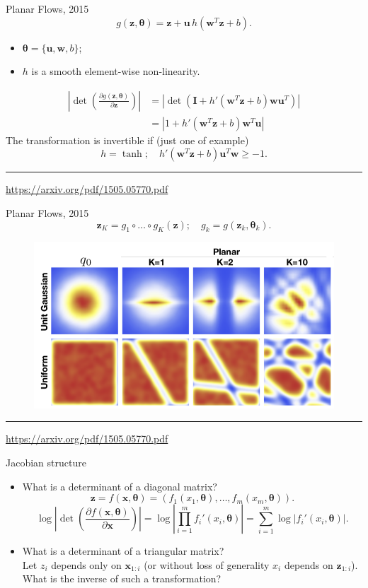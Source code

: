 \documentclass{beamer}
\newcommand{\bu}{\mathbf{u}}
\newcommand{\bw}{\mathbf{w}}
\newcommand{\bx}{\mathbf{x}}
\newcommand{\bz}{\mathbf{z}}
\newcommand{\bI}{\mathbf{I}}
\newcommand{\btheta}{\boldsymbol{\theta}}
\begin{document}
\begin{frame}{Planar Flows, 2015}
	\vspace{-0.2cm}
	\[
	g(\bz, \btheta) = \bz + \mathbf{u} \, h(\bw^T\bz + b).
	\]
	\vspace{-0.2cm}
	\begin{itemize}
		\item $\btheta = \{\bu, \bw, b\}$;
		\item $h$ is a smooth element-wise non-linearity.
	\end{itemize}
	\begin{align*}
		\left| \det \left( \frac{\partial g(\bz, \btheta)}{\partial \bz} \right)\right| &= \left| \det \left( \bI +  h'(\bw^T \bz + b) \bw\bu^T\right) \right| \\
		&= \left| 1 + h'(\bw^T \bz + b) \bw^T \bu \right|
	\end{align*}
	The transformation is invertible if (just one of example)
	\[
	h = \tanh; \quad h'(\bw^T \bz + b) \bu^T \bw \geq -1.
	\]
	\vfill
	\hrule\medskip
	{\scriptsize \href{https://arxiv.org/pdf/1505.05770.pdf}{https://arxiv.org/pdf/1505.05770.pdf}} 
\end{frame}
\begin{frame}{Planar Flows, 2015}
	\[
	\bz_K = g_1 \circ \dots \circ g_K (\bz); \quad g_k = g(\bz_k, \btheta_k).
	\]
	\begin{figure}
		\centering
		\includegraphics[width=0.9\linewidth]{figs/planar_flows.png}
	\end{figure}
	\vfill
	\hrule\medskip
	{\scriptsize \href{https://arxiv.org/pdf/1505.05770.pdf}{https://arxiv.org/pdf/1505.05770.pdf}} 
\end{frame}
\begin{frame}{Jacobian structure}
	\begin{itemize}
		\item What is a determinant of a diagonal matrix?
		\[
		\bz = f(\bx, \btheta) = (f_1(x_1, \btheta), \dots, f_m(x_m, \btheta)).
		\]
		\[
		\log \left|\det \left( \frac{\partial f(\bx, \btheta)}{\partial \bx} \right) \right| = \log \left| \prod_{i=1}^m f_i'(x_i, \btheta) \right| = \sum_{i=1}^m \log \left| f_i'(x_i, \btheta) \right|.
		\]
		\item What is a determinant of a triangular matrix? \\
		Let $z_i$ depends only on $\bx_{1:i}$ (or without loss of generality $x_i$ depends on $\bz_{1:i}$). \\
		What is the inverse of such a transformation?
	\end{itemize}
\end{frame}
\end{document}

